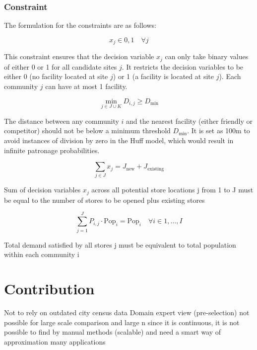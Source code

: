 \documentclass{ecai}
\begin{document}
\subsubsection{Constraint}
The formulation for the constraints are as follows:

\begin{equation}
x_j \in {0, 1} \quad \forall j
\end{equation}

This constraint ensures that the decision variable $x_j$ can only take binary values of either 0 or 1 for all candidate sites $j$. It restricts the decision variables to be either 0 (no facility located at site $j$) or 1 (a facility is located at site $j$). Each community $j$ can have at most 1 facility.

\begin{equation}
\min_{j \in J \cup K} D_{i,j} \geq D_{\min}
\end{equation}

The distance between any community $i$ and the nearest facility (either friendly or competitor) should not be below a minimum threshold $D_{\min}$. It is set as 100m to avoid instances of division by zero in the Huff model, which would result in infinite patronage probabilities.

\begin{equation}
\sum_{j \in J} x_j = J_{\text{new}} + J_{\text{existing}}
\end{equation}

Sum of decision variables $x_j$ across all potential store locations j from 1 to J must be equal to the number of stores to be opened plus existing stores 

\begin{equation}
\sum_{j=1}^{J} P_{i,j} \cdot \text{Pop}_i = \text{Pop}_i \quad \forall i \in {1, \ldots, I}
\end{equation}

Total demand satisfied by all stores j must be equivalent to total population within each community i 

\section{Contribution}
Not to rely on outdated city census data
Domain expert view (pre-selection) not possible for large scale comparison and large n
since it is continuous, it is not possible to find by manual methods (scalable) and need a smart way of approximation
many applications
\end{document}
